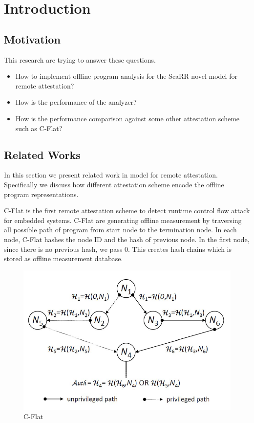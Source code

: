 
\chapter{Introduction} %

\label{Chapter1} %


\section{Motivation}

This research are trying to answer these questions.
\begin{itemize}
    \item How to implement offline program analysis for the ScaRR novel model for remote attestation?
    \item How is the performance of the analyzer?
    \item How is the performance comparison against some other attestation scheme such as C-Flat?
\end{itemize}

\section{Related Works}

In this section we present related work in model for remote attestation. Specifically we discuss how different attestation scheme encode the offline program representations.

C-Flat \cite{aberaCFLATControlFlowAttestation2016} is the first remote attestation scheme to detect runtime control flow attack for embedded systems. C-Flat are generating offline measurement by traversing all possible path of program from start node to the termination node. In each node, C-Flat hashes the node ID and the hash of previous node. In the first node, since there is no previous hash, we pass 0. This creates hash chains which is stored as offline measurement database.

\begin{figure}[htbp]
\centerline{\includegraphics[scale=.5]{Figures/01/cflat.png}}
\caption{C-Flat}
\label{fig:c-flat}
\end{figure}

